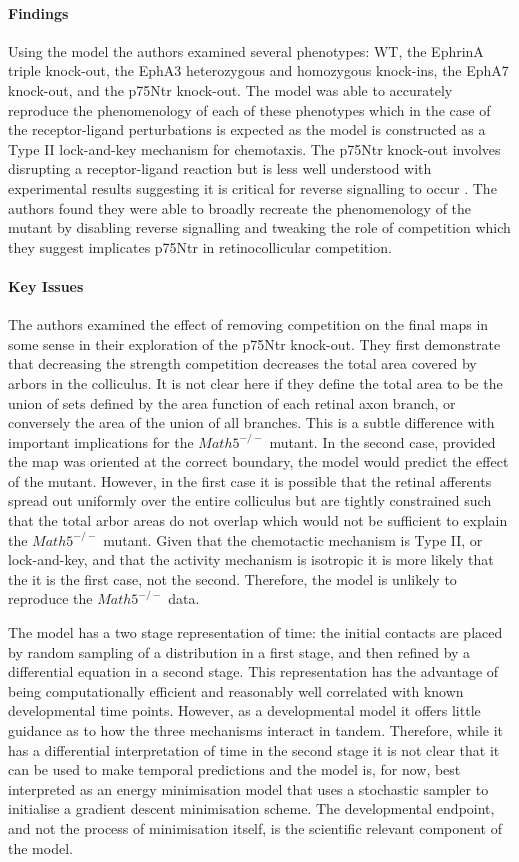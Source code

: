 \paragraph{Findings}
Using the model the authors examined several phenotypes: WT, the EphrinA triple knock-out, the EphA3 heterozygous and homozygous knock-ins, the EphA7 knock-out, and the p75Ntr knock-out. The model was able to accurately reproduce the phenomenology of each of these phenotypes which in the case of the receptor-ligand perturbations is expected as the model is constructed as a Type II lock-and-key mechanism for chemotaxis. The p75Ntr knock-out involves disrupting a receptor-ligand reaction but is less well understood with experimental results suggesting it is critical for reverse signalling to occur \cite{Lim2008-bq}. The authors found they were able to broadly recreate the phenomenology of the mutant by disabling reverse signalling and tweaking the role of competition which they suggest implicates p75Ntr in retinocollicular competition.
\paragraph{Key Issues}
The authors examined the effect of removing competition on the final maps in some sense in their exploration of the p75Ntr knock-out. They first demonstrate that decreasing the strength competition decreases the total area covered by arbors in the colliculus. It is not clear here if they define the total area to be the union of sets defined by the area function of each retinal axon branch, or conversely the area of the union of all branches. This is a subtle difference with important implications for the $Math5^{-/-}$ mutant. In the second case, provided the map was oriented at the correct boundary, the model would predict the effect of the mutant. However, in the first case it is possible that the retinal afferents spread out uniformly over the entire colliculus but are tightly constrained such that the total arbor areas do not overlap which would not be sufficient to explain the $Math5^{-/-}$ mutant. Given that the chemotactic mechanism is Type II, or lock-and-key, and that the activity mechanism is isotropic it is more likely that the it is the first case, not the second. Therefore, the model is unlikely to reproduce the $Math5^{-/-}$ data.

The model has a two stage representation of time: the initial contacts are placed by random sampling of a distribution in a first stage, and then refined by a differential equation in a second stage. This representation has the advantage of being computationally efficient and reasonably well correlated with known developmental time points. However, as a developmental model it offers little guidance as to how the three mechanisms interact in tandem. Therefore, while it has a differential interpretation of time in the second stage it is not clear that it can be used to make temporal predictions and the model is, for now, best interpreted as an energy minimisation model that uses a stochastic sampler to initialise a gradient descent minimisation scheme. The developmental endpoint, and not the process of minimisation itself, is the scientific relevant component of the model.
